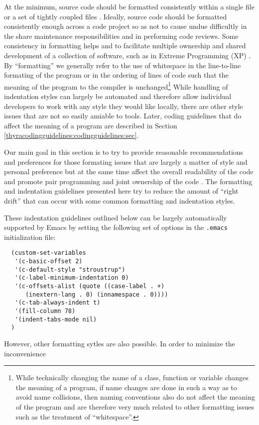 At the minimum, source code should be formatted consistently within a single
file or a set of tightly coupled files {}\cite[Item 0]{C++CodingStandards05}.
Ideally, source code should be formatted consistently enough across a code
project so as not to cause undue difficultly in the share maintenance
responsibilities and in performing code reviews.  Some consistency in
formatting helps and to facilitate multiple ownership and shared development
of a collection of software, such as in Extreme Programming (XP)
{}\cite{ExtremeProgramming}.  By ``formatting'' we generally refer to the use
of whitespace in the line-to-line formating of the program or in the ordering
of lines of code such that the meaning of the program to the compiler is
unchanged\footnote{While technically changing the name of a class, function
or variable changes the meaning of a program, if name changes are done in such
a way as to avoid name collisions, then naming conventions also do not affect
the meaning of the program and are therefore very much related to other
formatting issues such as the treatment of ``whitespace''.}  While handling of
indentation styles can largely be automated {}\cite{ArtisticStyle} and
therefore allow individual developers to work with any style they would like
locally, there are other style issues that are not so easily amiable to
tools.  Later, coding guidelines that do affect the meaning of a program are
described in Section {}\ref{thyracodingguidelines:codingguidelines:sec}.

Our main goal in this section is to try to provide reasonable recommendations
and preferences for those formating issues that are largely a matter of style
and personal preference but at the same time affect the overall readability of
the code and promote pair programming and joint ownership of the code
{}\cite{ExtremeProgramming}.  The formatting and indentation guidelines
presented here try to reduce the amount of ``right drift'' that can occur with
some common formatting and indentation styles.

These indentation guidelines outlined below can be largely automatically
supported by Emacs by setting the following set of options in the
{}\texttt{.emacs} initialization file:
%
{\small\begin{verbatim}
  (custom-set-variables
   '(c-basic-offset 2)
   '(c-default-style "stroustrup")
   '(c-label-minimum-indentation 0)
   '(c-offsets-alist (quote ((case-label . +)
      (inextern-lang . 0) (innamespace . 0))))
   '(c-tab-always-indent t)
   '(fill-column 78)
   '(indent-tabs-mode nil)
  )
\end{verbatim}}
%
However, other formatting sytles are also possible.  In order to minimize the
inconvenience


